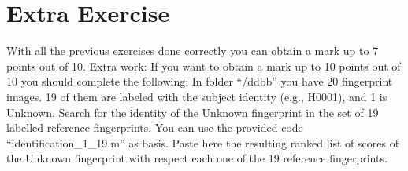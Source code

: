 \documentclass[a4paper]{article}
\begin{document}
\section{Extra Exercise}
With all the previous exercises done correctly you can obtain a mark up to 7 points out of 10. 
Extra work: If you want to obtain a mark up to 10 points out of 10 you should complete the following:
In folder “/ddbb” you have 20 fingerprint images. 19 of them are labeled with the subject identity (e.g., H0001), and 1 is Unknown. Search for the identity of the Unknown fingerprint in the set of 19 labelled reference fingerprints. You can use the provided code “identification\_1\_19.m” as basis. Paste here the resulting ranked list of scores of the Unknown fingerprint with respect each one of the 19 reference fingerprints.
\end{document}

